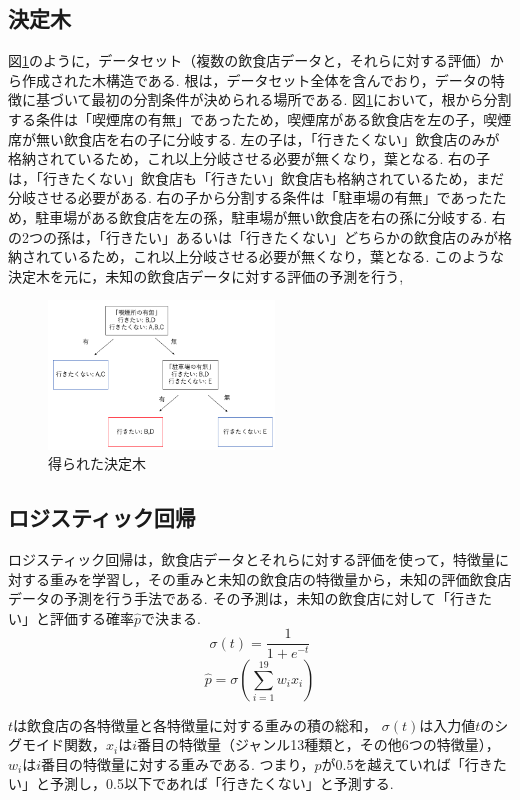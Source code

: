 \documentclass[9pt,twocolumn]{jsarticle}
\begin{document}
\subsection{決定木}
図\ref{fig10}のように，データセット（複数の飲食店データと，それらに対する評価）から作成された木構造である.
根は，データセット全体を含んでおり，データの特徴に基づいて最初の分割条件が決められる場所である.
図\ref{fig10}において，根から分割する条件は「喫煙席の有無」であったため，喫煙席がある飲食店を左の子，喫煙席が無い飲食店を右の子に分岐する.
左の子は，「行きたくない」飲食店のみが格納されているため，これ以上分岐させる必要が無くなり，葉となる.
右の子は，「行きたくない」飲食店も「行きたい」飲食店も格納されているため，まだ分岐させる必要がある.
右の子から分割する条件は「駐車場の有無」であったため，駐車場がある飲食店を左の孫，駐車場が無い飲食店を右の孫に分岐する.
右の2つの孫は，「行きたい」あるいは「行きたくない」どちらかの飲食店のみが格納されているため，これ以上分岐させる必要が無くなり，葉となる.
このような決定木を元に，未知の飲食店データに対する評価の予測を行う,
\begin{figure}[htbp]
    \begin{center}
      \includegraphics[width=6cm]{image/fig10.png}
      \caption{得られた決定木}
      \label{fig10}
    \end{center}
\end{figure}

\subsection{ロジスティック回帰}
ロジスティック回帰は，飲食店データとそれらに対する評価を使って，特徴量に対する重みを学習し，その重みと未知の飲食店の特徴量から，未知の評価飲食店データの予測を行う手法である.
その予測は，未知の飲食店に対して「行きたい」と評価する確率\(\hat{p}\)で決まる.
\[
\sigma(t) = \frac{1}{1 + e^{-t}}
\]
\[
\hat{p} = \sigma\left(\sum_{i=1}^{19} w_i x_i\right)
\]

\( t \)は飲食店の各特徴量と各特徴量に対する重みの積の総和，
\( \sigma(t) \)は入力値\( t \)のシグモイド関数，\( x_i \)は\( i \)番目の特徴量（ジャンル13種類と，その他6つの特徴量），\( w_i \)は\( i \)番目の特徴量に対する重みである.
つまり，\(\hat{p}\)が0.5を越えていれば「行きたい」と予測し，0.5以下であれば「行きたくない」と予測する.
\end{document}
